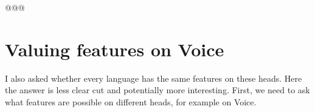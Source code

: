 %
%
%


@@@
\section{Valuing features on Voice} \label{i:agree}
I also asked whether every language has the same features on these heads. Here the answer is less clear cut and potentially more interesting. First, we need to ask what features are possible on different heads, for example on Voice.

